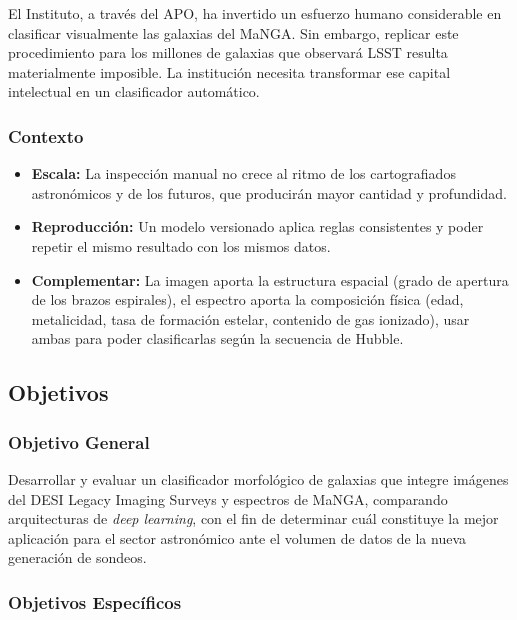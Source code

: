 \documentclass[12pt]{article}
\begin{document}
El Instituto, a través del APO, ha invertido un esfuerzo humano considerable en clasificar visualmente las galaxias del MaNGA. Sin embargo, replicar este procedimiento para los millones de galaxias que observará LSST resulta materialmente imposible. La institución necesita transformar ese capital intelectual en un clasificador automático.

\subsubsection{Contexto}

\begin{itemize}
    \item \textbf{Escala:} La inspección manual no crece al ritmo de los cartografiados astronómicos y de los futuros, que producirán mayor cantidad y profundidad.
    \item \textbf{Reproducción:} Un modelo versionado aplica reglas consistentes y poder repetir el mismo resultado con los mismos datos.
    \item \textbf{Complementar:} La imagen aporta la estructura espacial (grado de apertura de los brazos espirales), el espectro aporta la composición física (edad, metalicidad, tasa de formación estelar, contenido de gas ionizado), usar ambas para poder clasificarlas según la secuencia de Hubble.
\end{itemize}

\subsection{Objetivos}
\subsubsection{Objetivo General}

Desarrollar y evaluar un clasificador morfológico de galaxias que integre imágenes del DESI Legacy Imaging Surveys y espectros de MaNGA, comparando arquitecturas de \textit{deep learning}, con el fin de determinar cuál constituye la mejor aplicación para el sector astronómico ante el volumen de datos de la nueva generación de sondeos.

\subsubsection{Objetivos Específicos}
\end{document}
